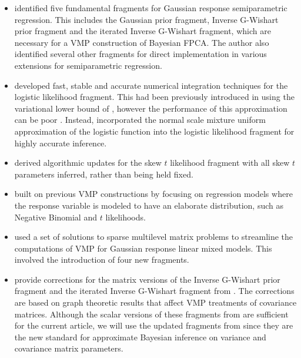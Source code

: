 \documentclass[12pt]{article}
\theoremstyle{plain}
\theoremstyle{definition}
\theoremstyle{remark}
\begin{document}
\begin{itemize}
	\item {} identified five fundamental fragments for Gaussian response semiparametric regression.
	This includes the Gaussian prior fragment, Inverse G-Wishart prior fragment and the iterated Inverse
	G-Wishart fragment, which are necessary for a VMP construction of Bayesian FPCA. The author also
	identified several other fragments for direct implementation in various extensions for semiparametric
	regression.
	\item {} developed fast, stable and accurate numerical integration techniques for 
	the logistic likelihood fragment. This had been previously introduced in  using the
	variational lower bound of , however the performance of this approximation can be poor
	\cite{knowles11}. Instead,  incorporated the normal scale mixture uniform approximation of
	the logistic function \cite{monahan92} into the logistic likelihood fragment for highly accurate inference.
	\item {} derived algorithmic updates for the skew $t$ likelihood fragment with all skew $t$
	parameters inferred, rather than being held fixed.
	\item {} built on previous VMP constructions by focusing on regression models where
	the response variable is modeled to have an elaborate distribution, such as Negative Binomial and
	$t$ likelihoods.
	\item {} used a set of solutions to sparse multilevel matrix problems \cite{nolan19} to
	streamline the computations of VMP for Gaussian response linear mixed models. This involved the
	introduction of four new fragments.
	\item {} provide corrections for the matrix versions of the Inverse G-Wishart prior fragment
	and the iterated Inverse G-Wishart fragment from . The corrections are based on graph
	theoretic results that affect VMP treatments of covariance matrices. Although the scalar versions of these
	fragments from  are sufficient for the current article, we will use the updated fragments
	from  since they are the new standard for approximate Bayesian inference on variance
	and covariance matrix parameters.
\end{itemize}

\end{document}
